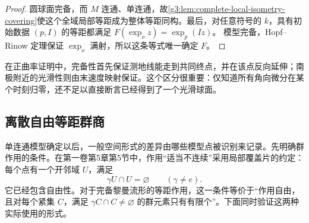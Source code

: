 \begin{proof}
	圆球面完备，而 \(M\) 连通、单连通，故\cref{g3:lem:complete-local-isometry-covering}使这个全域局部等距成为整体等距同构。最后，对任意符号的 \(k\)，具有初始数据 \((p,I)\) 的等距都满足
	\(F(\exp_o z)=\exp_p(Iz)\)。
	模型完备，Hopf--Rinow 定理保证 \(\exp_o\) 满射，所以这条等式唯一确定 \(F\)。
\end{proof}

在正曲率证明中，完备性首先保证测地线能走到共同终点，并在该点反向延伸；南极附近的光滑性则由末速度映射保证。这个区分很重要：仅知道所有角向微分在某个时刻归零，还不足以直接断言已经得到了一个光滑球面。

\subsection{离散自由等距群商}
\label{g3:subsec:0902:03}

单连通模型确定以后，一般空间形式的差异由哪些模型点被识别来记录。先明确群作用的条件。在第一卷第5章第5节中，作用“适当不连续”采用局部覆盖片的约定：每个点有一个开邻域 \(U\)，满足
\[
	\gamma U\cap U=\varnothing\qquad(\gamma\ne e).
\]
它已经包含自由性。对于完备黎曼流形的等距作用，这一条件等价于“作用自由，且对每个紧集 \(C\)，满足 \(\gamma C\cap C\ne\varnothing\) 的群元素只有有限个”。下面同时验证这两种实际使用的形式。

